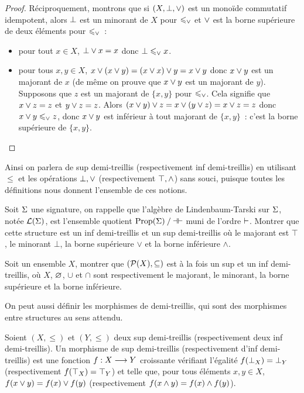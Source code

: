 \begin{proof}
  Réciproquement, montrons que si $(X,\bot,\vee)$ est un monoïde commutatif
  idempotent, alors $\bot$ est un minorant de $X$ pour $\leqslant_{\vee}$ et
  $\vee$ est la borne supérieure de deux éléments pour $\leqslant_{\vee}$~:
  \begin{itemize}
  \item pour tout $x\in X$, $\bot \vee x = x$ donc $\bot \leqslant_{\vee} x$.
  \item pour tous $x,y\in X$, $x\vee (x\vee y) = (x\vee x)\vee y = x\vee y$
    donc $x\vee y$ est un majorant de $x$ (de même on prouve que $x\vee y$
    est un majorant de $y$). Supposons que $z$ est un majorant de $\{x,y\}$ pour
    $\leqslant_{\vee}$. Cela signifie que $x\vee z = z$ et $y\vee z = z$. Alors
    $(x\vee y)\vee z = x\vee (y\vee z) = x\vee z = z$ donc
    $x\vee y \leqslant_{\vee} z$, donc $x\vee y$ est inférieur à tout majorant de
    $\{x,y\}$~: c'est la borne supérieure de $\{x,y\}$.\qedhere
  \end{itemize}
\end{proof}

Ainsi on parlera de sup demi-treillis (respectivement inf demi-treillis) en
utilisant $\leq$ et les opérations $\bot,\vee$ (respectivement $\top,\wedge$)
sans souci, puisque toutes les définitions nous donnent l'ensemble de ces
notions.

\begin{exercise}
  Soit $\Sigma$ une signature, on rappelle que l'algèbre de Lindenbaum-Tarski
  sur $\Sigma$, notée $\mathcal{L}(\Sigma)$, est l'ensemble quotient
  $\mathord{\operatorname{Prop}(\Sigma)}\mathbin{/}\mathord{\mathrel{\mathord{\dashv}\mathord{\vdash}}}$ muni de l'ordre $\vdash$. Montrer que
  cette structure est un inf demi-treillis et un sup demi-treillis où le
  majorant est $\top$, le minorant $\bot$, la borne supérieure $\lor$ et la
  borne inférieure $\land$.
\end{exercise}

\begin{exercise}
  Soit un ensemble $X$, montrer que $(\mathcal{P}(X),\subseteq)$ est à la fois un
  sup et un inf demi-treillis, où $X$, $\varnothing$, $\cup$ et $\cap$ sont
  respectivement le majorant, le minorant, la borne supérieure et la borne
  inférieure.
\end{exercise}

On peut aussi définir les morphismes de demi-treillis, qui sont des morphismes
entre structures au sens attendu.

\begin{definition}
  Soient $(X,\leq)$ et $(Y,\leq)$ deux sup demi-treillis (respectivement deux
  inf demi-treillis). Un morphisme de sup demi-treillis (respectivement d'inf
  demi-treillis) est une fonction $f : \displaystyle X \longrightarrow Y$ croissante vérifiant
  l'égalité $f(\bot_X) = \bot_Y$ (respectivement $f(\top_X) = \top_Y$) et telle
  que, pour tous éléments $x,y\in X$, $f(x\vee y) = f(x)\vee f(y)$
  (respectivement $f(x\wedge y) = f(x)\wedge f(y)$).
\end{definition}

